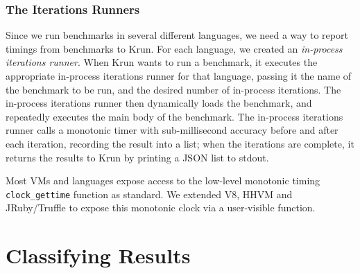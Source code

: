 \documentclass[a4paper,UKenglish]{lipics}
\newcommand{\krun}{Krun\xspace}
\begin{document}
%
%
%


\subsubsection{The Iterations Runners}

Since we run benchmarks in several different languages, we need a way to report
timings from benchmarks to \krun. For each language, we created an
\emph{in-process iterations runner}. When \krun wants to run a benchmark, it executes the
appropriate in-process iterations runner for that language, passing it the name of the
benchmark to be run, and the desired number of in-process iterations. The in-process iterations runner
then dynamically loads the benchmark, and repeatedly executes the main body of
the benchmark. The in-process iterations runner calls a monotonic timer with
sub-millisecond accuracy before and after each iteration, recording the result
into a list; when the iterations are complete, it returns the results
to \krun by printing a JSON list to stdout.

Most VMs and languages expose access to the low-level monotonic timing
\texttt{clock\_gettime} function as standard. We extended V8, HHVM and JRuby/Truffle
to expose this monotonic clock via a user-visible function.


\section{Classifying Results}
\label{sec:Results}
\end{document}
